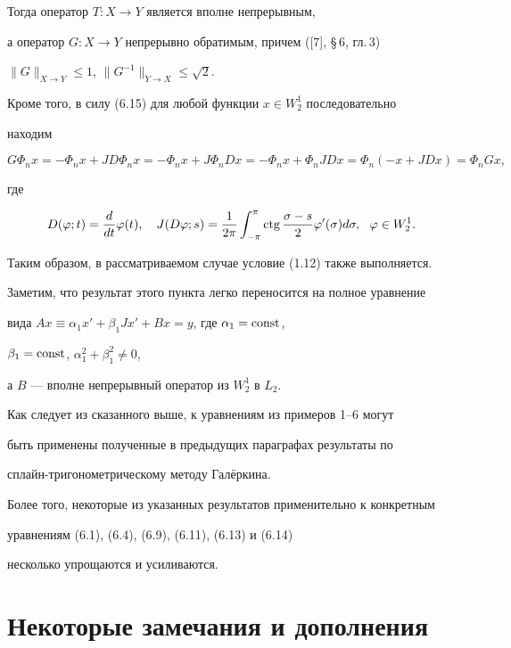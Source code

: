 Тогда оператор $T:X\to Y$ является вполне непрерывным,


а оператор $G:X\to Y$ непрерывно обратимым, причем ([7], \S\,6, гл.\,3)


$\|G\|_{X\to Y}\le 1$, $\|G^{-1}\|_{Y\to X}\le \sqrt{2}$.


Кроме того, в силу (6.15) для любой функции $x\in W_2^1$ последовательно


находим


$$


G\Phi_n x=-\Phi_nx+JD\Phi_n x=-\Phi_n x+J\Phi_n Dx=


-\Phi_n x+\Phi_n JDx=\Phi_n(-x+JDx)=\Phi_nGx,


$$


где


$$


D(\varphi;t)=\frac{d}{dt}\varphi(t),\quad J(D\varphi;s)=


\frac{1}{2\pi}\int_{-\pi}^{\pi}\ctg\frac{\sigma-s}{2}\varphi'(\sigma)


d\sigma,\ \ \varphi \in W_2^1.


$$


Таким образом, в рассматриваемом случае условие (1.12) также выполняется.





Заметим, что результат этого пункта легко переносится на полное уравнение


вида $Ax\equiv \alpha_1x'+\beta_1J x'+Bx=y$, где $\alpha_1=\operatorname{const}$,


$\beta_1=\operatorname{const}$, $\alpha_1^2+\beta_1^2\ne 0$,


а $B$ --- вполне непрерывный оператор из $W_2^1$ в $L_2$.





Как следует из сказанного выше, к уравнениям из примеров 1--6 могут


быть применены полученные в предыдущих параграфах результаты по


сплайн-тригонометрическому методу Гал\"еркина.


Более того, некоторые из указанных результатов применительно к конкретным


уравнениям (6.1), (6.4), (6.9), (6.11), (6.13) и (6.14) 


несколько упрощаются и усиливаются.





\section{Некоторые замечания и дополнения}





